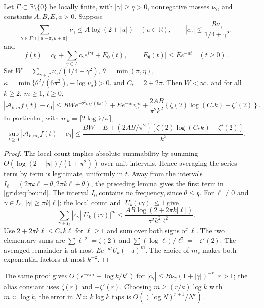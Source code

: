 \begin{theorem}\label{grid:thm:abstract}
Let $\Gamma\subset\mathbb R\setminus\{0\}$ be locally finite, with
$|\gamma|\ge\eta>0$, nonnegative masses $\nu_\gamma$, and constants $A,B,E,a>0$.
Suppose
\[
 \sum_{\gamma\in\Gamma\cap[u-\pi,u+\pi]}\nu_\gamma
 \le A\log(2+|u|)\quad(u\in\mathbb R),\qquad
 |c_\gamma|\le\frac{B\nu_\gamma}{1/4+\gamma^2},
\]
and
\[
 f(t)=c_0+\sum_{\gamma\in\Gamma}c_\gamma e^{i\gamma t}+E_0(t),
 \qquad |E_0(t)|\le E e^{-at}\quad(t\ge0).
\]
Set $W=\sum_{\gamma\in\Gamma}\nu_\gamma/(1/4+\gamma^2)$,
$\theta=\min(\pi,\eta)$,
$\kappa=\min\{\theta^2/(6\pi^2),-\log v_a\}>0$, and $C_*=2+2\pi$.
Then $W<\infty$, and for all $k\ge2$, $m\ge1$, $t\ge0$,
\begin{equation}\label{grid:eq:bound}
 |\mathcal A_{k,m}f(t)-c_0|
 \le BW e^{-\theta^2m/(6\pi^2)}+Ee^{-at}v_a^m
 +\frac{2AB}{\pi^2 k^2}
 \left\{\zeta(2)\log(C_*k)-\zeta'(2)\right\}.
\end{equation}
In particular, with $m_k=\lceil2\log k/\kappa\rceil$,
\[
 \sup_{t\ge0}|\mathcal A_{k,m_k}f(t)-c_0|
 \le\frac{BW+E+(2AB/\pi^2)
 [\zeta(2)\log(C_*k)-\zeta'(2)]}{k^2}.
\]
\end{theorem}
\begin{proof}
The local count implies absolute summability by summing
$O(\log(2+|n|)/(1+n^2))$ over unit intervals. Hence averaging the series
term by term is legitimate, uniformly in $t$. Away from the intervals
$I_\ell=(2\pi k\ell-\theta,2\pi k\ell+\theta)$, the preceding lemma
gives the first term in \eqref{grid:eq:bound}. The interval $I_0$ contains no
frequency, since $\theta\le\eta$. For $\ell\ne0$ and $\gamma\in I_\ell$,
$|\gamma|\ge\pi k|\ell|$; the local count and $|U_k(i\gamma)|\le1$ give
\[
 \sum_{\gamma\in I_\ell}|c_\gamma|\,|U_k(i\gamma)|^m
 \le\frac{AB\log(2+2\pi k|\ell|)}{\pi^2 k^2\ell^2}.
\]
Use $2+2\pi k\ell\le C_*k\ell$ for $\ell\ge1$ and sum over both
signs of $\ell$. The two elementary sums are
$\sum\ell^{-2}=\zeta(2)$ and
$\sum(\log\ell)/\ell^2=-\zeta'(2)$.
The averaged remainder is at most $Ee^{-at}U_k(-a)^m$.
The choice of $m_k$ makes both exponential factors at most $k^{-2}$.
\end{proof}

The same proof gives $O(e^{-\kappa m}+\log k/k^r)$ for
$|c_\gamma|\le B\nu_\gamma(1+|\gamma|)^{-r}$, $r>1$;
the alias constant uses $\zeta(r)$ and $-\zeta'(r)$. Choosing
$m\ge(r/\kappa)\log k$ with $m\asymp\log k$, the error in
$N\asymp k\log k$ taps is
$O((\log N)^{r+1}/N^r)$.

